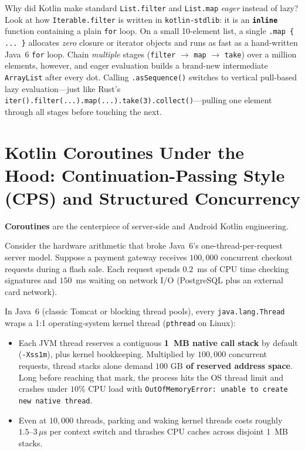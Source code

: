 Why did Kotlin make standard \texttt{List.filter} and \texttt{List.map} \emph{eager} instead of lazy? Look at how \texttt{Iterable.filter} is written in \texttt{kotlin-stdlib}: it is an \textbf{\texttt{inline}} function containing a plain \texttt{for} loop. On a small 10-element list, a single \texttt{.map \{ ... \}} allocates \emph{zero} closure or iterator objects and runs as fast as a hand-written Java~6 \texttt{for} loop. Chain \emph{multiple} stages (\texttt{filter} $\to$ \texttt{map} $\to$ \texttt{take}) over a million elements, however, and eager evaluation builds a brand-new intermediate \texttt{ArrayList} after every dot. Calling \texttt{.asSequence()} switches to vertical pull-based lazy evaluation---just like Rust's \texttt{iter().filter(...).map(...).take(3).collect()}---pulling one element through all stages before touching the next.

\section{Kotlin Coroutines Under the Hood: Continuation-Passing Style (CPS) and Structured Concurrency}
\label{ch10:coroutines-cps-structured}

\textbf{Coroutines} are the centerpiece of server-side and Android Kotlin engineering.

Consider the hardware arithmetic that broke Java~6's one-thread-per-request server model. Suppose a payment gateway receives $100{,}000$ concurrent checkout requests during a flash sale. Each request spends $0.2$~ms of CPU time checking signatures and $150$~ms waiting on network I/O (PostgreSQL plus an external card network).

In Java~6 (classic Tomcat or blocking thread pools), every \texttt{java.lang.Thread} wraps a 1:1 operating-system kernel thread (\texttt{pthread} on Linux):
\begin{itemize}
  \item Each JVM thread reserves a contiguous \textbf{1~MB native call stack} by default (\texttt{-Xss1m}), plus kernel bookkeeping. Multiplied by $100{,}000$ concurrent requests, thread stacks alone demand \textbf{$100\text{ GB}$ of reserved address space}. Long before reaching that mark, the process hits the OS thread limit and crashes under $10\%$ CPU load with \texttt{OutOfMemoryError: unable to create new native thread}.
  \item Even at $10{,}000$ threads, parking and waking kernel threads costs roughly $1.5\text{--}3\,\mu\text{s}$ per context switch and thrashes CPU caches across disjoint 1~MB stacks.
\end{itemize}

